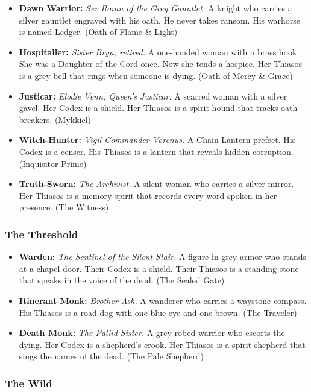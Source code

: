 \begin{itemize}
\item \textbf{Dawn Warrior:} \textit{Ser Roran of the Grey Gauntlet.} A knight who carries a silver gauntlet engraved with his oath. He never takes ransom. His warhorse is named Ledger. (Oath of Flame \& Light)
\item \textbf{Hospitaller:} \textit{Sister Bryn, retired.} A one-handed woman with a brass hook. She was a Daughter of the Cord once. Now she tends a hospice. Her Thiasos is a grey bell that rings when someone is dying. (Oath of Mercy \& Grace)
\item \textbf{Justicar:} \textit{Elodie Venn, Queen's Justicar.} A scarred woman with a silver gavel. Her Codex is a shield. Her Thiasos is a spirit-hound that tracks oath-breakers. (Mykkiel)
\item \textbf{Witch-Hunter:} \textit{Vigil-Commander Vorenus.} A Chain-Lantern prefect. His Codex is a censer. His Thiasos is a lantern that reveals hidden corruption. (Inquisitor Prime)
\item \textbf{Truth-Sworn:} \textit{The Archivist.} A silent woman who carries a silver mirror. Her Thiasos is a memory-spirit that records every word spoken in her presence. (The Witness)
\end{itemize}

\subsubsection{The Threshold}

\begin{itemize}
\item \textbf{Warden:} \textit{The Sentinel of the Silent Stair.} A figure in grey armor who stands at a chapel door. Their Codex is a shield. Their Thiasos is a standing stone that speaks in the voice of the dead. (The Sealed Gate)
\item \textbf{Itinerant Monk:} \textit{Brother Ash.} A wanderer who carries a waystone compass. His Thiasos is a road-dog with one blue eye and one brown. (The Traveler)
\item \textbf{Death Monk:} \textit{The Pallid Sister.} A grey-robed warrior who escorts the dying. Her Codex is a shepherd's crook. Her Thiasos is a spirit-shepherd that sings the names of the dead. (The Pale Shepherd)
\end{itemize}

\subsubsection{The Wild}

